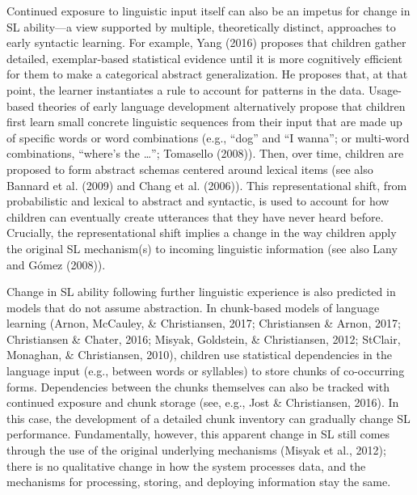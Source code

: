 \documentclass[
  english,
  man,floatsintext]{apa6}
\begin{document}
Continued exposure to linguistic input itself can also be an impetus for change in SL ability---a view supported by multiple, theoretically distinct, approaches to early syntactic learning. For example, Yang (2016) proposes that children gather detailed, exemplar-based statistical evidence until it is more cognitively efficient for them to make a categorical abstract generalization. He proposes that, at that point, the learner instantiates a rule to account for patterns in the data. Usage-based theories of early language development alternatively propose that children first learn small concrete linguistic sequences from their input that are made up of specific words or word combinations (e.g., \enquote{dog} and \enquote{I wanna}; or multi-word combinations, \enquote{where's the \ldots{}}; Tomasello (2008)). Then, over time, children are proposed to form abstract schemas centered around lexical items (see also Bannard et al. (2009) and Chang et al. (2006)). This representational shift, from probabilistic and lexical to abstract and syntactic, is used to account for how children can eventually create utterances that they have never heard before. Crucially, the representational shift implies a change in the way children apply the original SL mechanism(s) to incoming linguistic information (see also Lany and Gómez (2008)).

Change in SL ability following further linguistic experience is also predicted in models that do not assume abstraction. In chunk-based models of language learning (Arnon, McCauley, \& Christiansen, 2017; Christiansen \& Arnon, 2017; Christiansen \& Chater, 2016; Misyak, Goldstein, \& Christiansen, 2012; StClair, Monaghan, \& Christiansen, 2010), children use statistical dependencies in the language input (e.g., between words or syllables) to store chunks of co-occurring forms. Dependencies between the chunks themselves can also be tracked with continued exposure and chunk storage (see, e.g., Jost \& Christiansen, 2016). In this case, the development of a detailed chunk inventory can gradually change SL performance. Fundamentally, however, this apparent change in SL still comes through the use of the original underlying mechanisms (Misyak et al., 2012); there is no qualitative change in how the system processes data, and the mechanisms for processing, storing, and deploying information stay the same.
\end{document}
